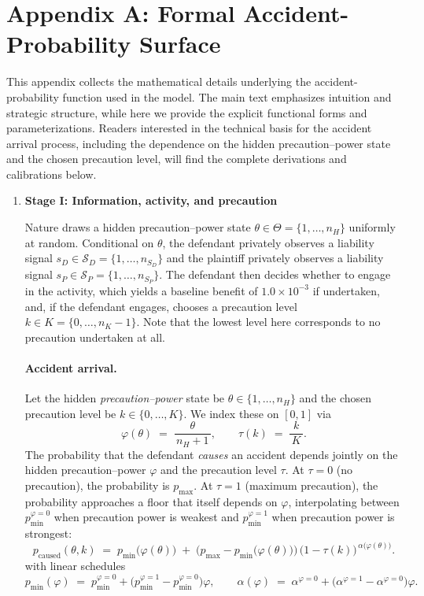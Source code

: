 \documentclass{article}
\begin{document}
\section*{Appendix A: Formal Accident-Probability Surface}

This appendix collects the mathematical details underlying the accident-probability function used in the model. The main text emphasizes intuition and strategic structure, while here we provide the explicit functional forms and parameterizations. Readers interested in the technical basis for the accident arrival process, including the dependence on the hidden precaution–power state and the chosen precaution level, will find the complete derivations and calibrations below.


\begin{enumerate}
  \item \textbf{Stage I: Information, activity, and precaution}

Nature draws a hidden precaution--power state $\theta \in \Theta = \{1,\dots,n_H\}$ uniformly at random. Conditional on $\theta$, the defendant privately observes a liability signal $s_D \in \mathcal{S}_D = \{1,\dots,n_{S_D}\}$ and the plaintiff privately observes a liability signal $s_P \in \mathcal{S}_P = \{1,\dots,n_{S_P}\}$. The defendant then decides whether to engage in the activity, which yields a baseline benefit of $1.0 \times 10^{-3}$ if undertaken, and, if the defendant engages, chooses a precaution level $k \in K = \{0,\dots,n_K-1\}$. Note that the lowest level here corresponds to no precaution undertaken at all.

\paragraph{Accident arrival.}
Let the hidden \emph{precaution–power} state be $\theta\in\{1,\dots,n_H\}$ and the chosen precaution level be $k\in\{0,\dots,K\}$.  We index these on $[0,1]$ via
\[
\varphi(\theta) \;=\; \frac{\theta}{\,n_H+1\,}, 
\qquad
\tau(k) \;=\; \frac{k}{\,K\,}.
\]
The probability that the defendant \emph{causes} an accident depends jointly on the hidden precaution–power $\varphi$ and the precaution level $\tau$.  At $\tau=0$ (no precaution), the probability is $p_{\max}$.  At $\tau=1$ (maximum precaution), the probability approaches a floor that itself depends on $\varphi$, interpolating between $p_{\min}^{\varphi=0}$ when precaution power is weakest and $p_{\min}^{\varphi=1}$ when precaution power is strongest:
\begin{equation}
p_{\mathrm{caused}}(\theta,k)
\;=\;
p_{\min}\!\bigl(\varphi(\theta)\bigr)
\;+\;
\bigl(p_{\max}-p_{\min}\!\bigl(\varphi(\theta)\bigr)\bigr)\,
\bigl(1-\tau(k)\bigr)^{\,\alpha\!\bigl(\varphi(\theta)\bigr)}.
\label{eq:pcaused}
\end{equation}
with linear schedules
\[
p_{\min}(\varphi) \;=\; p_{\min}^{\varphi=0} + \bigl(p_{\min}^{\varphi=1}-p_{\min}^{\varphi=0}\bigr)\varphi,
\qquad
\alpha(\varphi) \;=\; \alpha^{\varphi=0} + \bigl(\alpha^{\varphi=1}-\alpha^{\varphi=0}\bigr)\varphi.
\]


\end{enumerate}
\end{document}
